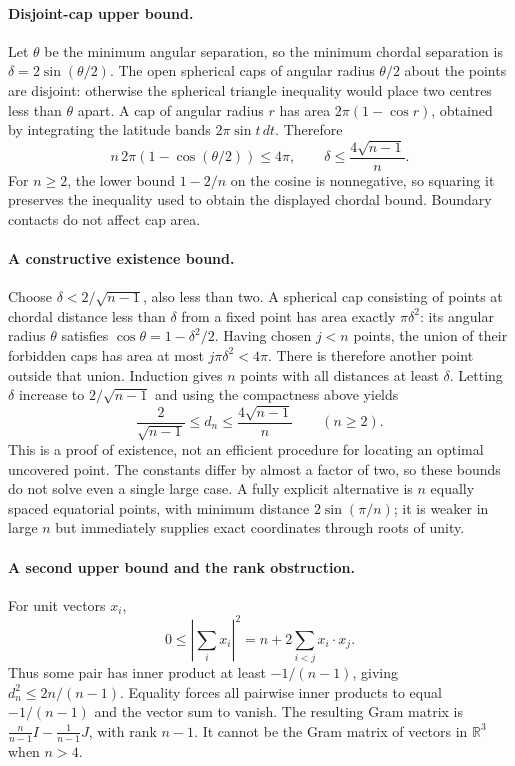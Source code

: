 \documentclass[11pt,a4paper]{article}
\begin{document}
\paragraph{Disjoint-cap upper bound.}
Let $\theta$ be the minimum angular separation, so the minimum chordal separation is $\delta=2\sin(\theta/2)$. The open spherical caps of angular radius $\theta/2$ about the points are disjoint: otherwise the spherical triangle inequality would place two centres less than $\theta$ apart. A cap of angular radius $r$ has area $2\pi(1-\cos r)$, obtained by integrating the latitude bands $2\pi\sin t\,dt$. Therefore
\[
n\,2\pi(1-\cos(\theta/2))\le4\pi,
\qquad \delta\le\frac{4\sqrt{n-1}}{n}.
\]
For $n\ge2$, the lower bound $1-2/n$ on the cosine is nonnegative, so squaring it preserves the inequality used to obtain the displayed chordal bound. Boundary contacts do not affect cap area.

\paragraph{A constructive existence bound.}
Choose $\delta<2/\sqrt{n-1}$, also less than two. A spherical cap consisting of points at chordal distance less than $\delta$ from a fixed point has area exactly $\pi\delta^2$: its angular radius $\theta$ satisfies $\cos\theta=1-\delta^2/2$. Having chosen $j<n$ points, the union of their forbidden caps has area at most $j\pi\delta^2<4\pi$. There is therefore another point outside that union. Induction gives $n$ points with all distances at least $\delta$. Letting $\delta$ increase to $2/\sqrt{n-1}$ and using the compactness above yields
\[
\frac2{\sqrt{n-1}}\le d_n\le\frac{4\sqrt{n-1}}n\qquad(n\ge2).
\]
This is a proof of existence, not an efficient procedure for locating an optimal uncovered point. The constants differ by almost a factor of two, so these bounds do not solve even a single large case. A fully explicit alternative is $n$ equally spaced equatorial points, with minimum distance $2\sin(\pi/n)$; it is weaker in large $n$ but immediately supplies exact coordinates through roots of unity.

\paragraph{A second upper bound and the rank obstruction.}
For unit vectors $x_i$,
\[
0\le\left|\sum_i x_i\right|^2
=n+2\sum_{i<j}x_i\cdot x_j.
\]
Thus some pair has inner product at least $-1/(n-1)$, giving $d_n^2\le2n/(n-1)$. Equality forces all pairwise inner products to equal $-1/(n-1)$ and the vector sum to vanish. The resulting Gram matrix is $\frac n{n-1}I-\frac1{n-1}J$, with rank $n-1$. It cannot be the Gram matrix of vectors in $\mathbb R^3$ when $n>4$.
\end{document}
